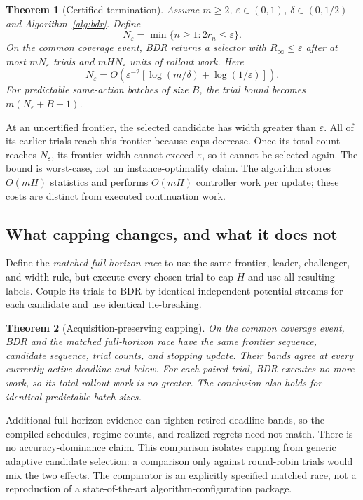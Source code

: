 \documentclass[11pt]{article}
\newtheorem{theorem}{Theorem}
\theoremstyle{definition}\newtheorem{definition}[theorem]{Definition}
\newcommand{\eps}{\varepsilon}
\begin{document}
\begin{theorem}[Certified termination]\label{thm:racing}
Assume $m\ge2$, $\eps\in(0,1)$, $\delta\in(0,1/2)$ and Algorithm~\ref{alg:bdr}. Define
\begin{equation}
 N_\eps=\min\{n\ge1:2r_n\le\eps\}.
\end{equation}
On the common coverage event, BDR returns a selector with $R_\infty\le\eps$ after at most $mN_\eps$ trials and $mHN_\eps$ units of rollout work. Here
\begin{equation}
 N_\eps=O\!\left(\eps^{-2}\left[\log(m/\delta)+\log(1/\eps)\right]\right).
\end{equation}
For predictable same-action batches of size $B$, the trial bound becomes $m(N_\eps+B-1)$.
\end{theorem}
At an uncertified frontier, the selected candidate has width greater than $\eps$. All of its earlier trials reach this frontier because caps decrease. Once its total count reaches $N_\eps$, its frontier width cannot exceed $\eps$, so it cannot be selected again. The bound is worst-case, not an instance-optimality claim. The algorithm stores $O(mH)$ statistics and performs $O(mH)$ controller work per update; these costs are distinct from executed continuation work.

\subsection{What capping changes, and what it does not}
Define the \emph{matched full-horizon race} to use the same frontier, leader, challenger, and width rule, but execute every chosen trial to cap $H$ and use all resulting labels. Couple its trials to BDR by identical independent potential streams for each candidate and use identical tie-breaking.

\begin{theorem}[Acquisition-preserving capping]\label{thm:coupling}
On the common coverage event, BDR and the matched full-horizon race have the same frontier sequence, candidate sequence, trial counts, and stopping update. Their bands agree at every currently active deadline and below. For each paired trial, BDR executes no more work, so its total rollout work is no greater. The conclusion also holds for identical predictable batch sizes.
\end{theorem}
Additional full-horizon evidence can tighten retired-deadline bands, so the compiled schedules, regime counts, and realized regrets need not match. There is no accuracy-dominance claim. This comparison isolates capping from generic adaptive candidate selection: a comparison only against round-robin trials would mix the two effects. The comparator is an explicitly specified matched race, not a reproduction of a state-of-the-art algorithm-configuration package.
\end{document}
